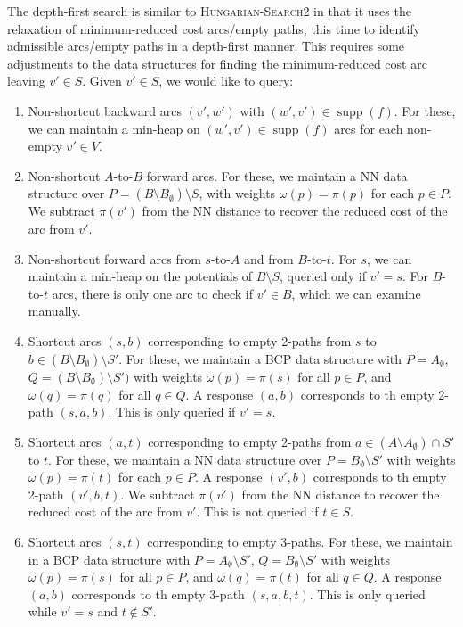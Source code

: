 \documentclass[11pt]{article}
\def\supp{\operatorname{supp}}
\theoremstyle{plain}
\numberwithin{figure}{section}
\begin{document}
The depth-first search is similar to \textsc{Hungarian-Search2} in that it
uses the relaxation of minimum-reduced cost arcs/empty paths, this time to
identify admissible arcs/empty paths in a depth-first manner.
This requires some adjustments to the data structures for finding the
minimum-reduced cost arc leaving $v' \in S$.
Given $v' \in S$, we would like to query:
\begin{enumerate}
\item Non-shortcut backward arcs $(v', w')$ with $(w', v') \in \supp(f)$.
	For these, we can maintain a min-heap on $(w', v') \in \supp(f)$ arcs
	for each non-empty $v' \in V$.
\item Non-shortcut $A$-to-$B$ forward arcs.
	For these, we maintain a NN data structure over
	$P = (B \setminus B_\emptyset) \setminus S$, with weights
	$\omega(p) = \pi(p)$ for each $p \in P$.
	We subtract $\pi(v')$ from the NN distance to recover the reduced cost
	of the arc from $v'$.
\item Non-shortcut forward arcs from $s$-to-$A$ and from $B$-to-$t$.
	For $s$, we can maintain a min-heap on the potentials of
	$B \setminus S$, queried only if $v' = s$.
	For $B$-to-$t$ arcs, there is only one arc to check if $v' \in B$,
	which we can examine manually.

\item Shortcut arcs $(s, b)$ corresponding to empty 2-paths from $s$ to
	$b \in (B \setminus B_\emptyset) \setminus S'$.
	For these, we maintain a BCP data structure with $P = A_\emptyset$,
	$Q = (B \setminus B_\emptyset) \setminus S')$ with weights
	$\omega(p) = \pi(s)$ for all $p \in P$, and $\omega(q) = \pi(q)$ for
	all $q \in Q$.
	A response $(a, b)$ corresponds to th empty 2-path $(s, a, b)$.
	This is only queried if $v' = s$.
\item Shortcut arcs $(a, t)$ corresponding to empty 2-paths from
	$a \in (A \setminus A_\emptyset) \cap S'$ to $t$.
	For these, we maintain a NN data structure over
	$P = B_\emptyset \setminus S'$ with weights $\omega(p) = \pi(t)$ for
	each $p \in P$.
	A response $(v', b)$ corresponds to th empty 2-path $(v', b, t)$.
	We subtract $\pi(v')$ from the NN distance to recover the reduced cost
	of the arc from $v'$.
	This is not queried if $t \in S$.
\item Shortcut arcs $(s, t)$ corresponding to empty 3-paths.
	For these, we maintain in a BCP data structure with
	$P = A_\emptyset \setminus S'$, $Q = B_\emptyset \setminus S'$ with
	weights $\omega(p) = \pi(s)$ for all
	$p \in P$, and $\omega(q) = \pi(t)$ for all $q \in Q$.
	A response $(a, b)$ corresponds to th empty 3-path $(s, a, b, t)$.
	This is only queried while $v' = s$ and $t \not\in S'$.
\end{enumerate}
\end{document}
